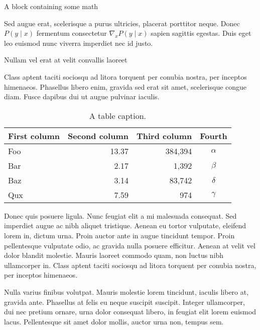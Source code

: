 \documentclass[final]{beamer}
\newlength{\colwidth}
\begin{document}
\begin{frame}[t]
\begin{columns}[t]
\begin{column}{\colwidth}
\begin{block}{A block containing some math}

				Sed augue erat, scelerisque a purus ultricies, placerat porttitor neque.
				Donec $P(y \mid x)$ fermentum consectetur $\nabla_x P(y \mid x)$ sapien
				sagittis egestas. Duis eget leo euismod nunc viverra imperdiet nec id
				justo.

			\end{block}

			\begin{block}{Nullam vel erat at velit convallis laoreet}

				Class aptent taciti sociosqu ad litora torquent per conubia nostra, per
				inceptos himenaeos. Phasellus libero enim, gravida sed erat sit amet,
				scelerisque congue diam. Fusce dapibus dui ut augue pulvinar iaculis.

				\begin{table}
					\centering
					\begin{tabular}{l r r c}
						\toprule
						\textbf{First column} & \textbf{Second column} & \textbf{Third column} & \textbf{Fourth} \\
						\midrule
						Foo                   & 13.37                  & 384,394               & $\alpha$        \\
						Bar                   & 2.17                   & 1,392                 & $\beta$         \\
						Baz                   & 3.14                   & 83,742                & $\delta$        \\
						Qux                   & 7.59                   & 974                   & $\gamma$        \\
						\bottomrule
					\end{tabular}
					\caption{A table caption.}
				\end{table}

				Donec quis posuere ligula. Nunc feugiat elit a mi malesuada consequat. Sed
				imperdiet augue ac nibh aliquet tristique. Aenean eu tortor vulputate,
				eleifend lorem in, dictum urna. Proin auctor ante in augue tincidunt
				tempor. Proin pellentesque vulputate odio, ac gravida nulla posuere
				efficitur. Aenean at velit vel dolor blandit molestie. Mauris laoreet
				commodo quam, non luctus nibh ullamcorper in. Class aptent taciti sociosqu
				ad litora torquent per conubia nostra, per inceptos himenaeos.

				Nulla varius finibus volutpat. Mauris molestie lorem tincidunt, iaculis
				libero at, gravida ante. Phasellus at felis eu neque suscipit suscipit.
				Integer ullamcorper, dui nec pretium ornare, urna dolor consequat libero,
				in feugiat elit lorem euismod lacus. Pellentesque sit amet dolor mollis,
				auctor urna non, tempus sem.


\end{block}
\end{column}
\end{columns}
\end{frame}
\end{document}
